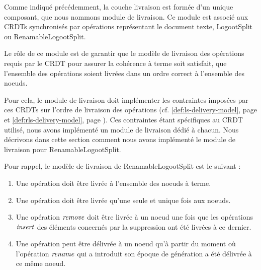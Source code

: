 \label{sec:mute-delivery-model}

Comme indiqué précédemment, la couche livraison est formée d'un unique composant, que nous nommons module de livraison.
Ce module est associé aux \acp{CRDT} synchronisés par opérations représentant le document texte, \ie LogootSplit ou RenamableLogootSplit.

Le rôle de ce module est de garantir que le modèle de livraison des opérations requis par le \ac{CRDT} pour assurer la cohérence à terme  soit satisfait, \ie que l'ensemble des opérations soient livrées dans un ordre correct à l'ensemble des noeuds.

Pour cela, le module de livraison doit implémenter les contraintes imposées par ces \acp{CRDT} sur l'ordre de livraison des opérations (cf. \autoref{def:ls-delivery-model}, page \pageref{def:ls-delivery-model} et \autoref{def:rls-delivery-model}, page \pageref{def:ls-delivery-model}).
Ces contraintes étant spécifiques au \ac{CRDT} utilisé, nous avons implémenté un module de livraison dédié à chacun.
Nous décrivons dans cette section comment nous avons implémenté le module de livraison pour RenamableLogootSplit.

Pour rappel, le modèle de livraison de RenamableLogootSplit est le suivant :
\begin{enumerate}
    \item Une opération doit être livrée à l'ensemble des noeuds à terme.
    \item Une opération doit être livrée qu'une seule et unique fois aux noeuds.
    \item Une opération $\mathit{remove}$ doit être livrée à un noeud une fois que les opérations $\mathit{insert}$ des éléments concernés par la suppression ont été livrées à ce dernier.
    \item Une opération peut être délivrée à un noeud qu'à partir du moment où l'opération $\mathit{rename}$ qui a introduit son époque de génération a été délivrée à ce même noeud.
\end{enumerate}

